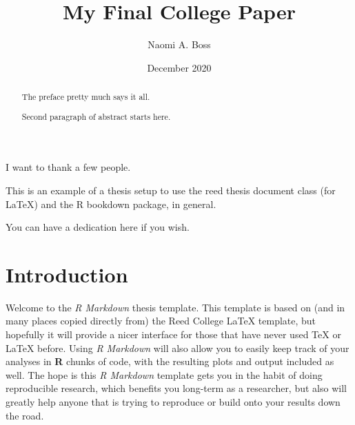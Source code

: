 \documentclass[12pt,twoside]{reedthesis}
\title{My Final College Paper}
\author{Naomi A. Boss}
\date{December 2020}
\begin{document}
  \maketitle

\frontmatter %
\pagestyle{empty} %
  \begin{acknowledgements}
    I want to thank a few people.
  \end{acknowledgements}
  \begin{preface}
    This is an example of a thesis setup to use the reed thesis document class
    (for LaTeX) and the R bookdown package, in general.
  \end{preface}
  \hypersetup{linkcolor=black}
  \setcounter{tocdepth}{2}
  \tableofcontents

  \listoftables

  \listoffigures
  \begin{abstract}
    The preface pretty much says it all.
    
    \par
    
    Second paragraph of abstract starts here.
  \end{abstract}
  \begin{dedication}
    You can have a dedication here if you wish.
  \end{dedication}
\mainmatter %
\pagestyle{fancyplain} %

\hypertarget{introduction}{%
\chapter*{Introduction}\label{introduction}}

Welcome to the \emph{R Markdown} thesis template. This template is based on (and in many places copied directly from) the Reed College LaTeX template, but hopefully it will provide a nicer interface for those that have never used TeX or LaTeX before. Using \emph{R Markdown} will also allow you to easily keep track of your analyses in \textbf{R} chunks of code, with the resulting plots and output included as well. The hope is this \emph{R Markdown} template gets you in the habit of doing reproducible research, which benefits you long-term as a researcher, but also will greatly help anyone that is trying to reproduce or build onto your results down the road.
\end{document}
